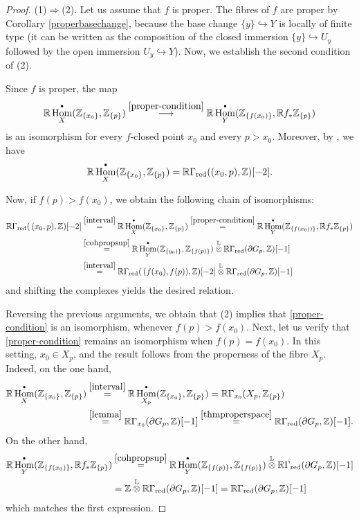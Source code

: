 \documentclass[amssymb,amscd,11pt,20pt]{amsart}
\newcommand{\LL}{{\mathbb L}}
\newcommand{\ZZ}{{\mathbb Z}}
\newcommand{\RR}{\mathbb R}
\newcommand{\0}{\mathbf 0}
\DeclareMathOperator{\Hom}{{Hom}}
\newcommand{\pun}{{\scriptscriptstyle \bullet}}
\theoremstyle{plain}
\numberwithin{equation}{thm}
\begin{document}
\begin{proof} (1)$\Rightarrow$(2). Let us assume that  $f$ is proper. The fibres of $f$ are proper by Corollary  \ref{properbasechange}, because the base change $\{y\}\hookrightarrow Y$ is locally of finite type (it can be written as the composition of the closed immersion $\{y\}\hookrightarrow U_{y}$ followed by the open immersion $U_y\hookrightarrow Y$). Now,  we establish the second condition of (2).

Since $f$ is proper, the map
\[\RR\Hom_X^\pun(\ZZ_{\{x_0\}} , \ZZ_{\{p\}}) \overset{\eqref{proper-condition}}\longrightarrow \RR\Hom^\pun_Y(\ZZ_{\{f(x_0)\}} , \RR f_*\ZZ_{\{p\}})\] is an isomorphism for every $f$-closed point $x_0$ and every $p> x_0$. Moreover, by \cite[Prop. 2.5]{ST2}, we have
\begin{equation} \label{interval}  
\RR\Hom_X^\pun(\ZZ_{\{x_0\}} , \ZZ_{\{p\}})=\RR\Gamma_{\text{\rm red}}((x_0,p),\ZZ)[-2].
\end{equation}



 Now, if $f(p)>f(x_0)$, we obtain the following chain of isomorphisms:

\[\aligned \RR\Gamma_{\text{\rm red}}(\,(x_0,p),\ZZ)[-2]& \overset{\eqref{interval}}= \RR\Hom_{X}^\pun(\ZZ_{\{x_0\}} , \ZZ_{\{p\}}) \overset{\eqref{proper-condition}}= \RR\Hom^\pun_Y(\ZZ_{\{f(x_0))\}} , \RR f_*\ZZ_{\{p\}})
\\ &\overset{\ref{cohpropsup}}= \RR\Hom^\pun_Y(\ZZ_{\{y_0)\}} ,  \ZZ_{\{f(p)\}}) \overset\LL\otimes \RR\Gamma_{\text{\rm red}}(\partial G_p,\ZZ)[-1]\\ & \overset{\eqref{interval}}= \RR\Gamma_{\text{\rm red}}(\,(f(x_0),f(p)),\ZZ)[-2] \overset\LL\otimes \RR\Gamma_{\text{\rm red}}(\partial G_p,\ZZ)[-1]\endaligned
\] and shifting the complexes yields the desired relation.

Reversing the previous arguments,  we obtain that (2) implies that \eqref{proper-condition}  is an isomorphism, whenever   $f(p)>f(x_0)$. Next, let us verify that \eqref{proper-condition} remains an isomorphism when $f(p) = f(x_0)$.   In this setting, $x_0\in X_p$, and the result follows from the properness of the fibre $X_p$. Indeed, on the one hand,
\[ \aligned \RR\Hom_{X}^\pun(\ZZ_{\{x_0\}} , \ZZ_{\{p\}})&\overset{\eqref{interval}}=  \RR\Hom_{X_p}^\pun(\ZZ_{\{x_0\}} , \ZZ_{\{p\}})=\RR\Gamma_{x_0}(X_p,\ZZ_{\{p\}})\\ & \overset{\ref{lemma}}=\RR\Gamma_{x_0}(\partial G_p,\ZZ)[-1] \overset{\ref{thmproperspace} }=\RR\Gamma_{\text{\rm red}}(\partial G_p,\ZZ)[-1].\endaligned\]
On the other hand,
\[ \aligned \RR\Hom_Y^\pun(\ZZ_{\{f(x_0)\}},\RR f_*\ZZ_{\{p\}}) &\overset{\ref{cohpropsup} }=\RR\Hom_Y^\pun(\ZZ_{\{f(p)\}},\ZZ_{\{f(p)\}})\overset\LL\otimes \RR\Gamma_{\text{\rm red}}(\partial G_p,\ZZ)[-1]\\ &=\ZZ\overset\LL \otimes \RR\Gamma_{\text{\rm red}}(\partial G_p,\ZZ)[-1]=  \RR\Gamma_{\text{\rm red}}(\partial G_p,\ZZ)[-1] \endaligned\] which matches the first expression.



\end{proof}
\end{document}
